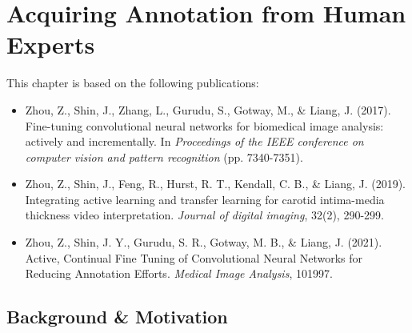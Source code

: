 \chapter{Acquiring Annotation from Human Experts}
\label{ch3}

This chapter is based on the following publications:
\begin{itemize}
    \item Zhou, Z., Shin, J., Zhang, L., Gurudu, S., Gotway, M., \& Liang, J. (2017). Fine-tuning convolutional neural networks for biomedical image analysis: actively and incrementally. In \textit{Proceedings of the IEEE conference on computer vision and pattern recognition} (pp. 7340-7351).
    \item Zhou, Z., Shin, J., Feng, R., Hurst, R. T., Kendall, C. B., \& Liang, J. (2019). Integrating active learning and transfer learning for carotid intima-media thickness video interpretation. \textit{Journal of digital imaging}, 32(2), 290-299.
    \item Zhou, Z., Shin, J. Y., Gurudu, S. R., Gotway, M. B., \& Liang, J. (2021). Active, Continual Fine Tuning of Convolutional Neural Networks for Reducing Annotation Efforts. \textit{Medical Image Analysis}, 101997.
\end{itemize}



\newpage


\section{Background \& Motivation}
\label{ch3:backgroun_motivation}

